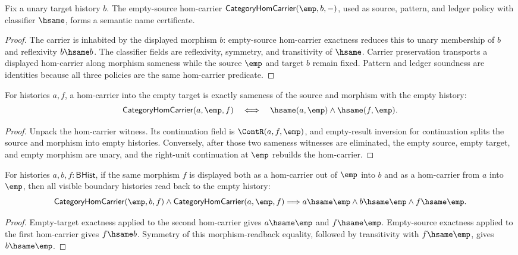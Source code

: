 \begin{theorem}
\label{thm:category-empty-source-semantic-namecert}
Fix a unary target history \(b\). The empty-source hom-carrier
\(\mathsf{CategoryHomCarrier}(\emp,b,-)\), used as source, pattern, and
ledger policy with classifier \(\hsame\), forms a semantic name certificate.
\end{theorem}
\begin{proof}
The carrier is inhabited by the displayed morphism \(b\): empty-source
hom-carrier exactness reduces this to unary membership of \(b\) and
reflexivity \(b\hsame b\). The classifier fields are reflexivity, symmetry,
and transitivity of \(\hsame\). Carrier preservation transports a displayed
hom-carrier along morphism sameness while the source \(\emp\) and target \(b\)
remain fixed. Pattern and ledger soundness are identities because all three
policies are the same hom-carrier predicate.
\end{proof}

\begin{theorem}
\label{thm:category-hom-carrier-empty-target-iff}
For histories $a,f$, a hom-carrier into the empty target is exactly sameness of
the source and morphism with the empty history:
$$
\mathsf{CategoryHomCarrier}(a,\emp,f)
\quad\Longleftrightarrow\quad
\hsame(a,\emp)\wedge\hsame(f,\emp).
$$
\end{theorem}
\begin{proof}
Unpack the hom-carrier witness. Its continuation field is
$\ContR(a,f,\emp)$, and empty-result inversion for continuation splits the
source and morphism into empty histories. Conversely, after those two sameness
witnesses are eliminated, the empty source, empty target, and empty morphism
are unary, and the right-unit continuation at $\emp$ rebuilds the hom-carrier.
\end{proof}

\begin{theorem}
\label{thm:category-empty-source-empty-target-same-morphism-boundary}
For histories $a,b,f:\mathsf{BHist}$, if the same morphism $f$ is displayed
both as a hom-carrier out of $\emp$ into $b$ and as a hom-carrier from $a$ into
$\emp$, then all visible boundary histories read back to the empty history:
$$
\mathsf{CategoryHomCarrier}(\emp,b,f)\land
\mathsf{CategoryHomCarrier}(a,\emp,f)
\Longrightarrow
a\hsame\emp\land b\hsame\emp\land f\hsame\emp.
$$
\end{theorem}
\begin{proof}
Empty-target exactness applied to the second hom-carrier gives
$a\hsame\emp$ and $f\hsame\emp$. Empty-source exactness applied to the first
hom-carrier gives $f\hsame b$. Symmetry of this morphism-readback equality,
followed by transitivity with $f\hsame\emp$, gives $b\hsame\emp$.
\end{proof}

